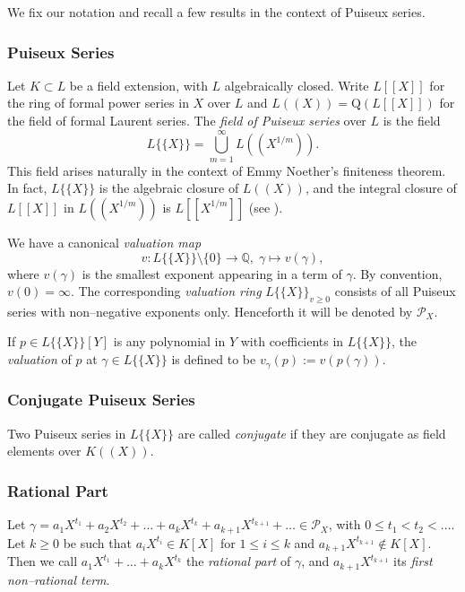 \documentclass[a4paper,11pt]{amsart}%
\theoremstyle{definition}
\theoremstyle{plain}
\theoremstyle{remark}
\begin{document}
\label{sect:basic-Puiseux}

We fix our notation and recall a few results in the context of Puiseux series.

\subsubsection*{Puiseux Series}

Let $K\subset L$ be a field extension, with $L$ algebraically closed. Write
$L[[X]]$ for the ring of formal power series in $X$ over $L$ and $L((X)) =
{\text{Q}}(L[[X]])$ for the field of formal Laurent series. The \textit{{field
of Puiseux series}} over $L$ is the field
\[
L\{\{X\}\}=\bigcup_{m=1}^{\infty}L((X^{1/m})).
\]
This field arises naturally in the context of Emmy Noether's finiteness
theorem. In fact, $L\{\{X\}\}$ is the algebraic closure of $L((X))$, and the
integral closure of $L[[X]]$ in $L((X^{1/m}))$ is $L[[X^{1/m}]]$ (see
\cite[Corollary 13.15]{Eis}).

We have a canonical {\emph{valuation map}}
\[
v:L\{\{X\}\}\setminus\{0\}\rightarrow{\mathbb{Q}},\;\gamma\mapsto v(\gamma),
\]
where $v(\gamma)$ is the smallest exponent appearing in a term of $\gamma$. By
convention, $v(0)=\infty$. The corresponding \emph{valuation ring}
$L\{\{X\}\}_{v\geq0}$ consists of all Puiseux series with non--negative
exponents only. Henceforth it will be denoted by ${\mathcal{P}_{X}}$.

If $p\in L\{\{X\}\}[Y]$ is any polynomial in $Y$ with coefficients in
$L\{\{X\}\}$, the {\emph{valuation}} of $p$ at $\gamma\in L\{\{X\}\}$ is
defined to be $v_{\gamma}(p):=v(p(\gamma))$.

\subsubsection*{Conjugate Puiseux Series}

Two Puiseux series in $L\{\{X\}\}$ are called \emph{conjugate} if they are
conjugate as field elements over $K((X))$.

\subsubsection*{Rational Part}

Let $\gamma= a_{1}X^{t_{1}}+a_{2}X^{t_{2}}+\dots+a_{k}X^{t_{k}}+
a_{k+1}X^{t_{k+1}}+ \dots\in{\mathcal{P}_{X}}$, with $0 \le t_{1}<t_{2}<
\dots$. Let $k \geq0$ be such that $a_{i} X^{t_{i}}\in K[X]$ for $1 \leq i
\leq k$ and $a_{k+1} X^{t_{k+1}} \not \in K[X]$. Then we call $a_{1}X^{t_{1}%
}+\dots+a_{k}X^{t_{k}}$ the \emph{rational part} of $\gamma$, and
$a_{k+1}X^{t_{k+1}}$ its \emph{first non--rational term}.
\end{document}
